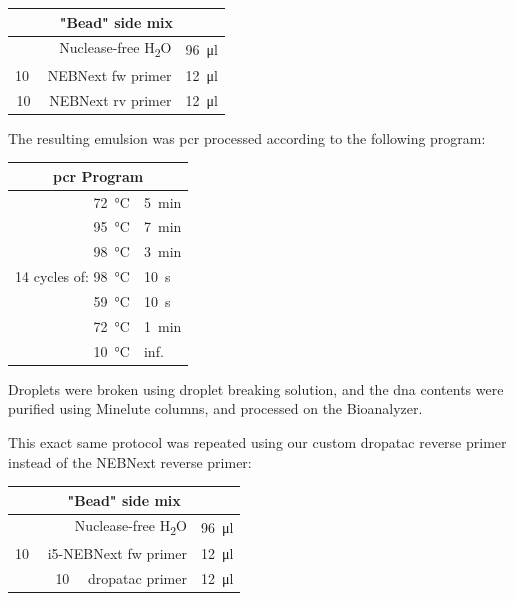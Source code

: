 \begin{appendix}
\begin{multicols}{2}
\begin{center}
\begin{tabular}{r|l}
	\multicolumn{2}{c}{"Bead" side mix} \\
	\hline
	Nuclease-free H\textsubscript{2}O & \SI{96}{\ul} \\
	\SI{10}{\micro\molar} NEBNext fw primer & \SI{12}{\ul} \\
	\SI{10}{\micro\molar} NEBNext rv primer  & \SI{12}{\ul} \\
\end{tabular}
\end{center}
\medskip

The resulting emulsion was \acrshort{pcr} processed according to the following program:\pms

\begin{center}
\begin{tabular}{r|l}
	\multicolumn{2}{c}{\acrshort{pcr} Program} \\
	\hline
	\SI{72}{\celsius} & \SI{5}{\minute} \\
	\SI{95}{\celsius} & \SI{7}{\minute} \\
	\SI{98}{\celsius} & \SI{3}{\minute} \\
	\hline
	14 cycles of: \SI{98}{\celsius} & \SI{10}{\second} \\
	\SI{59}{\celsius} & \SI{10}{\second} \\
	\SI{72}{\celsius} & \SI{1}{\minute} \\
	\hline
	\SI{10}{\celsius} & inf. \\
\end{tabular}
\end{center}
\medskip

Droplets were broken using droplet breaking solution, and the \acrshort{dna} contents were purified using Minelute columns, and processed on the Bioanalyzer.\pms

This exact same protocol was repeated using our custom \acrshort{dropatac} reverse primer instead of the NEBNext reverse primer:\pms

\begin{center}
\begin{tabular}{r|l}
	\multicolumn{2}{c}{"Bead" side mix} \\
	\hline
	Nuclease-free H\textsubscript{2}O & \SI{96}{\ul} \\
	\SI{10}{\micro\molar} i5-NEBNext fw primer & \SI{12}{\ul} \\
	\SI{10}{\micro\molar} \acrshort{dropatac} primer & \SI{12}{\ul} \\
\end{tabular}
\end{center}
\medskip


\end{multicols}
\end{appendix}
